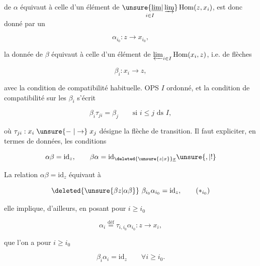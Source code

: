 %
%
de $\alpha$ équivaut à celle d'un élément de $\mathop{\unsure{\underline{\lim}|\varinjlim}}\limits_{i\in I}\operatorname{Hom}(z,x_i)$,  est donc donné par un

\[\alpha_{i_0}:z\longrightarrow x_{i_0},\]

la donnée de $\beta$ équivaut à celle d'un élément de $\varprojlim_{i\in I}\operatorname{Hom}(x_i,z)$, i.e. de flèches

\[\beta_i:x_i\longrightarrow z,\]

avec la condition de compatibilité habituelle.  OPS $I$ ordonné, et la condition  de compatibilité sur les $\beta_i$ s'écrit

\[\beta_i\tau_{ji}=\beta_j\qquad\text{si }i\leq j\text{ ds }I,\]

où $\tau_{ji}:x_i\mathrel{\unsure{\relbar|\to}}x_j$ désigne la flèche de transition. Il faut expliciter, en termes de  données, les conditions

\[\alpha\beta=\mathrm{id}_z,\qquad\beta\alpha=\mathrm{id}_{\deleted{\unsure{z|x}}\underline{x}}\unsure{,|!}\]


La relation $\alpha\beta=\mathrm{id}_z$ équivaut à \deleted{\unsure{$\beta$}}

\begingroup\makeatletter\tagsleft@true\makeatother
\[\deleted{\unsure{\beta z|\alpha\beta}}\ \beta_{i_0}\alpha_{i_0}=\mathrm{id}_z,\tag*{$(*_{i_0})$}\]
\endgroup

elle implique, d'ailleurs, en posant pour $i\geq i_0$

\[\alpha_i\overset{\mathrm{déf}}{=}\tau_{i,i_0}\alpha_{i_0}:z\longrightarrow x_i,\]

que l'on a pour $i\geq i_0$

\begingroup\makeatletter\tagsleft@true\makeatother
\[\beta_i\alpha_i=\mathrm{id}_z\qquad\forall i\geq i_0.\tag*{$(*_i)$}\]
\endgroup
